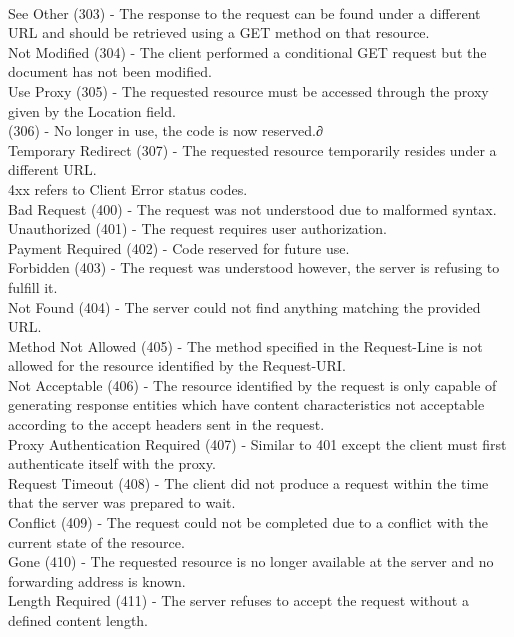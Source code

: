 \documentclass[titlepage]{article}
\begin{document}
\\
See Other (303) - The response to the request can be found under a different URL and should be retrieved using a GET method on that resource.
\\
Not Modified (304) - The client performed a conditional GET request but the document has not been modified.
\\
Use Proxy (305) - The requested resource must be accessed through the proxy given by the Location field.
\\
(306) - No longer in use, the code is now reserved.∂
\\
Temporary Redirect (307) - The requested resource temporarily resides under a different URL.
\\
4xx refers to Client Error status codes.
\\
Bad Request (400) - The request was not understood due to malformed syntax.
\\
Unauthorized (401) - The request requires user authorization.
\\
Payment Required (402) - Code reserved for future use.
\\
Forbidden (403) - The request was understood however, the server is refusing to fulfill it.
\\
Not Found (404) - The server could not find anything matching the provided URL.
\\
Method Not Allowed (405) - The method specified in the Request-Line is not allowed for the resource identified by the Request-URI.
\\
Not Acceptable (406) - The resource identified by the request is only capable of generating response entities which have content characteristics not acceptable according to the accept headers sent in the request.
\\
Proxy Authentication Required (407) - Similar to 401 except the client must first authenticate itself with the proxy.
\\
Request Timeout (408) - The client did not produce a request within the time that the server was prepared to wait.
\\
Conflict (409) - The request could not be completed due to a conflict with the current state of the resource.
\\
Gone (410) - The requested resource is no longer available at the server and no forwarding address is known.
\\
Length Required (411) - The server refuses to accept the request without a defined content length.
\\
\end{document}
